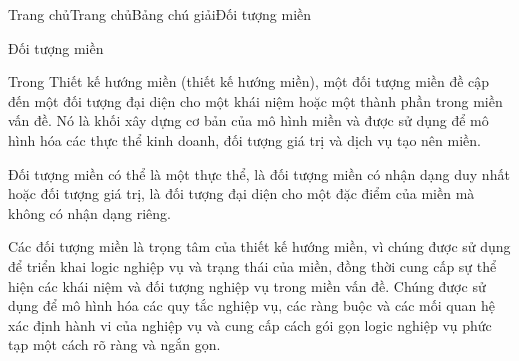 





Trang chủTrang chủBảng chú giảiĐối tượng miền

Đối tượng miền

Trong Thiết kế hướng miền (thiết kế hướng miền), một đối tượng miền đề cập đến một đối tượng đại diện cho một khái niệm hoặc một thành phần trong miền vấn đề. Nó là khối xây dựng cơ bản của mô hình miền và được sử dụng để mô hình hóa các thực thể kinh doanh, đối tượng giá trị và dịch vụ tạo nên miền.

Đối tượng miền có thể là một thực thể, là đối tượng miền có nhận dạng duy nhất hoặc đối tượng giá trị, là đối tượng đại diện cho một đặc điểm của miền mà không có nhận dạng riêng.

Các đối tượng miền là trọng tâm của thiết kế hướng miền, vì chúng được sử dụng để triển khai logic nghiệp vụ và trạng thái của miền, đồng thời cung cấp sự thể hiện các khái niệm và đối tượng nghiệp vụ trong miền vấn đề. Chúng được sử dụng để mô hình hóa các quy tắc nghiệp vụ, các ràng buộc và các mối quan hệ xác định hành vi của nghiệp vụ và cung cấp cách gói gọn logic nghiệp vụ phức tạp một cách rõ ràng và ngắn gọn.








